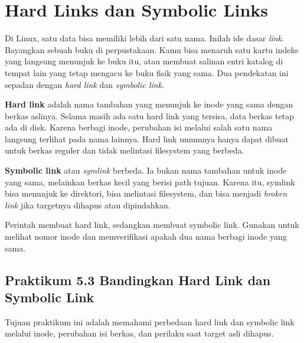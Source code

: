\section{Hard Links dan Symbolic Links}
\label{sec:links}

Di Linux, satu data bisa memiliki lebih dari satu nama. Inilah ide dasar \textit{link}.
Bayangkan sebuah buku di perpustakaan. Kamu bisa menaruh satu kartu indeks yang langsung
menunjuk ke buku itu, atau membuat salinan entri katalog di tempat lain yang tetap
mengacu ke buku fisik yang sama. Dua pendekatan ini sepadan dengan \textit{hard link}
dan \textit{symbolic link}.

\textbf{Hard link} adalah nama tambahan yang menunjuk ke inode yang sama dengan berkas
aslinya. Selama masih ada satu hard link yang tersisa, data berkas tetap ada di disk.
Karena berbagi inode, perubahan isi melalui salah satu nama langsung terlihat pada nama
lainnya. Hard link umumnya hanya dapat dibuat untuk berkas reguler dan tidak melintasi
filesystem yang berbeda.

\textbf{Symbolic link} atau \textit{symlink} berbeda. Ia bukan nama tambahan untuk inode
yang sama, melainkan berkas kecil yang berisi path tujuan. Karena itu, symlink bisa
menunjuk ke direktori, bisa melintasi filesystem, dan bisa menjadi \textit{broken link}
jika targetnya dihapus atau dipindahkan.

Perintah  membuat hard link, sedangkan 
membuat symbolic link. Gunakan  untuk melihat nomor inode dan memverifikasi
apakah dua nama berbagi inode yang sama.

\subsection*{Praktikum 5.3 Bandingkan Hard Link dan Symbolic Link}

Tujuan praktikum ini adalah memahami perbedaan hard link dan symbolic link melalui inode,
perubahan isi berkas, dan perilaku saat target asli dihapus.

